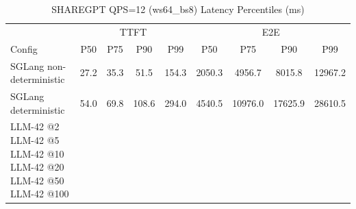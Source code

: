 \begin{table}[htbp]
\centering
\caption{SHAREGPT QPS=12 (ws64_bs8) Latency Percentiles (ms)}
\label{tab:sharegpt_qps12_ws64_bs8}
\begin{tabular}{l|cccc|cccc}
\toprule
& \multicolumn{4}{c|}{TTFT} & \multicolumn{4}{c}{E2E} \\
Config & P50 & P75 & P90 & P99 & P50 & P75 & P90 & P99 \\
\midrule
SGLang non-deterministic & 27.2 & 35.3 & 51.5 & 154.3 & 2050.3 & 4956.7 & 8015.8 & 12967.2 \\
SGLang deterministic & 54.0 & 69.8 & 108.6 & 294.0 & 4540.5 & 10976.0 & 17625.9 & 28610.5 \\
LLM-42 @2%
LLM-42 @5%
LLM-42 @10%
LLM-42 @20%
LLM-42 @50%
LLM-42 @100%
\bottomrule
\end{tabular}
\end{table}
